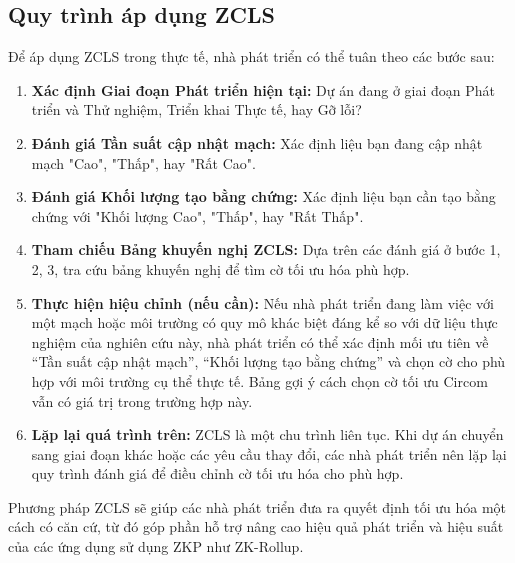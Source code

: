 \begin{enumerate}
\begin{itemize}
\begin{itemize}
        \end{itemize}
    \end{itemize}
    
\end{enumerate}

\subsection{Quy trình áp dụng ZCLS}
Để áp dụng ZCLS trong thực tế, nhà phát triển có thể tuân theo các bước sau:

\begin{enumerate}
    \item \textbf{Xác định Giai đoạn Phát triển hiện tại:} Dự án đang ở giai đoạn Phát triển và Thử nghiệm, Triển khai Thực tế, hay Gỡ lỗi?

    \item \textbf{Đánh giá Tần suất cập nhật mạch:} Xác định liệu bạn đang cập nhật mạch "Cao", "Thấp", hay "Rất Cao".

    \item \textbf{Đánh giá Khối lượng tạo bằng chứng:} Xác định liệu bạn cần tạo bằng chứng với "Khối lượng Cao", "Thấp", hay "Rất Thấp".

    \item \textbf{Tham chiếu Bảng khuyến nghị ZCLS:} Dựa trên các đánh giá ở bước 1, 2, 3, tra cứu bảng khuyến nghị để tìm cờ tối ưu hóa phù hợp.

    \item \textbf{Thực hiện hiệu chỉnh (nếu cần):} Nếu nhà phát triển đang làm việc với một mạch hoặc môi trường có quy mô khác biệt đáng kể so với dữ liệu thực nghiệm của nghiên cứu này, nhà phát triển có thể xác định mối ưu tiên về ``Tần suất cập nhật mạch'', ``Khối lượng tạo bằng chứng'' và chọn cờ cho phù hợp với môi trường cụ thể thực tế. Bảng gợi ý cách chọn cờ tối ưu Circom vẫn có giá trị trong trường hợp này.
    \item \textbf{Lặp lại quá trình trên:} ZCLS là một chu trình liên tục. Khi dự án chuyển sang giai đoạn khác hoặc các yêu cầu thay đổi, các nhà phát triển nên lặp lại quy trình đánh giá để điều chỉnh cờ tối ưu hóa cho phù hợp.
\end{enumerate}

Phương pháp ZCLS sẽ giúp các nhà phát triển đưa ra quyết định tối ưu hóa một cách có căn cứ, từ đó góp phần hỗ trợ nâng cao hiệu quả phát triển và hiệu suất của các ứng dụng sử dụng ZKP như ZK-Rollup.

\clearpage

